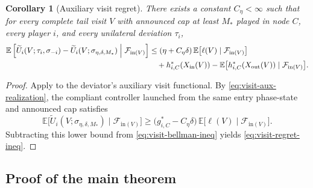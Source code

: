 \documentclass[12pt]{article}
\newtheorem{corollary}[theorem]{Corollary}
\theoremstyle{definition}
\newcommand{\E}{\mathbb{E}}
\newcommand{\1}{\mathbf{1}}
\newcommand{\cF}{\mathcal{F}}
\begin{document}
\begin{corollary}[Auxiliary visit regret]
\label{cor:visit-regret}
There exists a constant $C_\eta<\infty$ such that for every complete tail visit
$V$ with announced cap at least $M_*$ played in node $C$, every player $i$, and
every unilateral deviation $\tau_i$,
\begin{equation}
\label{eq:visit-regret-ineq}
\begin{aligned}
\E\left[
\widetilde U_i(V;\tau_i,\sigma_{-i})
-
\widetilde U_i(V;\sigma_{\eta,\delta,M_*})
\Bigm|\cF_{\mathrm{in}(V)}
\right]
&\le
(\eta+C_\eta\delta)\,\E\bigl[\ell(V)\mid\cF_{\mathrm{in}(V)}\bigr]
\\
&\quad+
h_{i,C}^*(X_{\mathrm{in}}(V))
-
\E\bigl[h_{i,C}^*(X_{\mathrm{out}}(V))\mid\cF_{\mathrm{in}(V)}\bigr].
\end{aligned}
\end{equation}
\end{corollary}

\begin{proof}
Apply  to the deviator's auxiliary visit functional.
By \eqref{eq:visit-aux-realization}, the compliant controller launched from the
same entry phase-state and announced cap satisfies
\[
\E\bigl[\widetilde U_i(V;\sigma_{\eta,\delta,M_*})\mid\cF_{\mathrm{in}(V)}\bigr]
\ge
\bigl(g_{i,C}^*-C_\eta\delta\bigr)\,
\E\bigl[\ell(V)\mid\cF_{\mathrm{in}(V)}\bigr].
\]
Subtracting this lower bound from \eqref{eq:visit-bellman-ineq} yields
\eqref{eq:visit-regret-ineq}.
\end{proof}

\subsection{Proof of the main theorem}
\end{document}
